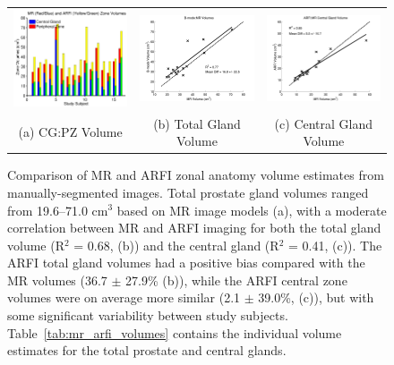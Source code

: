 \begin{figure}[htb!]
\centering
\begin{tabular}{ccc}
\includegraphics[width=0.3\linewidth]{figs/mr_arfi_volumes} &
\includegraphics[width=0.3\linewidth]{figs/mr_arfi_total_linreg} &
\includegraphics[width=0.3\linewidth]{figs/mr_arfi_central_linreg} \\
(a) CG:PZ Volume & (b) Total Gland Volume & (c) Central Gland Volume \\
\end{tabular}
\caption{Comparison of MR and ARFI zonal anatomy volume estimates from
    manually-segmented images.  Total prostate gland volumes ranged from 19.6--71.0
    cm$^3$ based on MR image models (a), with a moderate correlation between MR
    and ARFI imaging for both the total gland volume (R$^2$ = 0.68, (b)) and the
    central gland (R$^2$ = 0.41, (c)).  The ARFI total gland volumes had a positive bias
    compared with the MR volumes (36.7 $\pm$ 27.9\% (b)), while the ARFI
    central zone volumes were on average more similar (2.1 $\pm$ 39.0\%, (c)), but
    with some significant variability between study subjects.
    Table~\ref{tab:mr_arfi_volumes} contains the individual volume estimates
    for the total prostate and central glands.}
\label{fig:mr_arfi_volumes} 
\end{figure}
